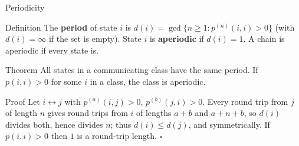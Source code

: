 \begin{frame}{Periodicity}
  \label{fr:period}
  \small
  \begin{block}{Definition}
    The \textbf{period} of state $i$ is $d(i)=\gcd\{n\ge1 : p^{(n)}(i,i)>0\}$ (with $d(i)=\infty$ if the set is empty). State $i$ is \textbf{aperiodic} if $d(i)=1$. A chain is aperiodic if every state is.
  \end{block}
  \begin{block}{Theorem}
    All states in a communicating class have the same period. If $p(i,i)>0$ for some $i$ in a class, the class is aperiodic.
  \end{block}
  \begin{block}{Proof}
    Let $i\leftrightarrow j$ with $p^{(a)}(i,j)>0$, $p^{(b)}(j,i)>0$. Every round trip from $j$ of length $n$ gives round trips from $i$ of lengths $a+b$ and $a+n+b$, so $d(i)$ divides both, hence divides $n$; thus $d(i)\le d(j)$, and symmetrically. If $p(i,i)>0$ then $1$ is a round-trip length. \hfill$\square$
  \end{block}
\end{frame}

